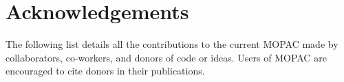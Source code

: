 




\chapter{Acknowledgements} The following list details all the
contributions to the current MOPAC made by collaborators, co-workers, and
donors of code or ideas.  Users of MOPAC are encouraged to cite donors in their
publications.
